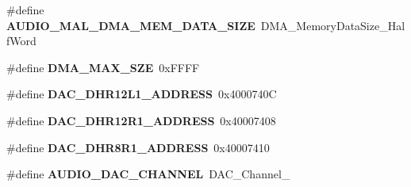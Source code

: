 \begin{DoxyCompactItemize}
\item 
\hypertarget{group___s_t_m32_f4___d_i_s_c_o_v_e_r_y___a_u_d_i_o___c_o_d_e_c___exported___constants_ga9b62ccbcd91b99c044f8f4899538deed}{\#define {\bfseries A\-U\-D\-I\-O\-\_\-\-M\-A\-L\-\_\-\-D\-M\-A\-\_\-\-M\-E\-M\-\_\-\-D\-A\-T\-A\-\_\-\-S\-I\-Z\-E}~D\-M\-A\-\_\-\-Memory\-Data\-Size\-\_\-\-Half\-Word}\label{group___s_t_m32_f4___d_i_s_c_o_v_e_r_y___a_u_d_i_o___c_o_d_e_c___exported___constants_ga9b62ccbcd91b99c044f8f4899538deed}

\item 
\hypertarget{group___s_t_m32_f4___d_i_s_c_o_v_e_r_y___a_u_d_i_o___c_o_d_e_c___exported___constants_ga42ed3f4f70b63747ef7d6af409d273e6}{\#define {\bfseries D\-M\-A\-\_\-\-M\-A\-X\-\_\-\-S\-Z\-E}~0x\-F\-F\-F\-F}\label{group___s_t_m32_f4___d_i_s_c_o_v_e_r_y___a_u_d_i_o___c_o_d_e_c___exported___constants_ga42ed3f4f70b63747ef7d6af409d273e6}

\item 
\hypertarget{group___s_t_m32_f4___d_i_s_c_o_v_e_r_y___a_u_d_i_o___c_o_d_e_c___exported___constants_ga01ab504450fbd94662ef375436c88a6e}{\#define {\bfseries D\-A\-C\-\_\-\-D\-H\-R12\-L1\-\_\-\-A\-D\-D\-R\-E\-S\-S}~0x4000740\-C}\label{group___s_t_m32_f4___d_i_s_c_o_v_e_r_y___a_u_d_i_o___c_o_d_e_c___exported___constants_ga01ab504450fbd94662ef375436c88a6e}

\item 
\hypertarget{group___s_t_m32_f4___d_i_s_c_o_v_e_r_y___a_u_d_i_o___c_o_d_e_c___exported___constants_gacbf063c53f62f5fc24ccdf6d99b9b61a}{\#define {\bfseries D\-A\-C\-\_\-\-D\-H\-R12\-R1\-\_\-\-A\-D\-D\-R\-E\-S\-S}~0x40007408}\label{group___s_t_m32_f4___d_i_s_c_o_v_e_r_y___a_u_d_i_o___c_o_d_e_c___exported___constants_gacbf063c53f62f5fc24ccdf6d99b9b61a}

\item 
\hypertarget{group___s_t_m32_f4___d_i_s_c_o_v_e_r_y___a_u_d_i_o___c_o_d_e_c___exported___constants_gaf31af6ecca4b1bf7a430102c060fda43}{\#define {\bfseries D\-A\-C\-\_\-\-D\-H\-R8\-R1\-\_\-\-A\-D\-D\-R\-E\-S\-S}~0x40007410}\label{group___s_t_m32_f4___d_i_s_c_o_v_e_r_y___a_u_d_i_o___c_o_d_e_c___exported___constants_gaf31af6ecca4b1bf7a430102c060fda43}

\item 
\hypertarget{group___s_t_m32_f4___d_i_s_c_o_v_e_r_y___a_u_d_i_o___c_o_d_e_c___exported___constants_ga70cccebfd6e08d2b447cb7109e2537a1}{\#define {\bfseries A\-U\-D\-I\-O\-\_\-\-D\-A\-C\-\_\-\-C\-H\-A\-N\-N\-E\-L}~D\-A\-C\-\_\-\-Channel\-\_}\label{group___s_t_m32_f4___d_i_s_c_o_v_e_r_y___a_u_d_i_o___c_o_d_e_c___exported___constants_ga70cccebfd6e08d2b447cb7109e2537a1}


\end{DoxyCompactItemize}

